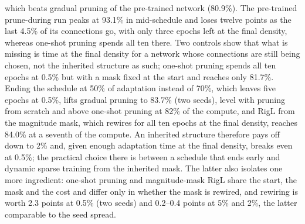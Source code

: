 \documentclass[11pt]{article}
\begin{document}
which beats gradual pruning of the pre-trained network (80.9\%). The pre-trained prune-during run peaks at 93.1\% in
mid-schedule and loses twelve points as the last 4.5\% of its connections go, with only three epochs left at the final
density, whereas one-shot pruning spends all ten there. Two controls show that what is missing is time at the final density for a network
whose connections are still being chosen, not the inherited structure as such; one-shot pruning spends all ten epochs at
0.5\% but with a mask fixed at the start and reaches only 81.7\%. Ending the schedule at 50\% of adaptation instead of
70\%, which leaves five epochs at 0.5\%, lifts gradual pruning to 83.7\% (two seeds), level with pruning from scratch and
above one-shot pruning at 82\% of the compute, and RigL from the magnitude mask, which rewires for all ten epochs at the
final density, reaches 84.0\% at a seventh of the compute. An inherited structure therefore pays off down to 2\% and, given enough adaptation time at the
final density, breaks even at 0.5\%; the practical choice there is between a schedule that ends early and dynamic sparse
training from the inherited mask. The latter also isolates one more ingredient: one-shot pruning and magnitude-mask RigL
share the start, the mask and the cost and differ only in whether the mask is rewired, and rewiring is worth 2.3 points at
0.5\% (two seeds) and 0.2--0.4 points at 5\% and 2\%, the latter comparable to the seed spread.
\end{document}
